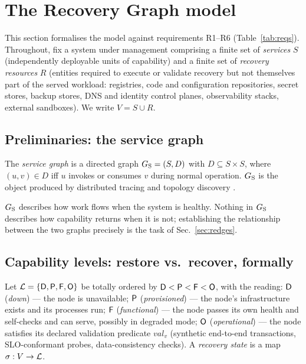 \section{The Recovery Graph model}
\label{sec:model}

This section formalises the model against requirements R1--R6 (Table~\ref{tab:reqs}). Throughout, fix a system under management comprising a finite set of \emph{services} $S$ (independently deployable units of capability) and a finite set of \emph{recovery resources} $R$ (entities required to execute or validate recovery but not themselves part of the served workload: registries, code and configuration repositories, secret stores, backup stores, DNS and identity control planes, observability stacks, external sandboxes). We write $V = S \cup R$.

\subsection{Preliminaries: the service graph}

\begin{definition}
\label{def:servicegraph}
The \emph{service graph} is a directed graph $G_{\mathrm{S}} = (S, D)$ with $D \subseteq S \times S$, where $(u,v) \in D$ iff $u$ invokes or consumes $v$ during normal operation. $G_{\mathrm{S}}$ is the object produced by distributed tracing and topology discovery \citep{sigelman2010dapper,luo2021characterizing}.
\end{definition}

$G_{\mathrm{S}}$ describes how work flows when the system is healthy. Nothing in $G_{\mathrm{S}}$ describes how capability returns when it is not; establishing the relationship between the two graphs precisely is the task of Sec.~\ref{sec:redges}.

\subsection{Capability levels: restore vs.\ recover, formally}
\label{sec:levels}

\begin{definition}
\label{def:levels}
Let $\mathcal{L} = \{\mathsf{D}, \mathsf{P}, \mathsf{F}, \mathsf{O}\}$ be totally ordered by $\mathsf{D} < \mathsf{P} < \mathsf{F} < \mathsf{O}$, with the reading: $\mathsf{D}$ (\emph{down}) --- the node is unavailable; $\mathsf{P}$ (\emph{provisioned}) --- the node's infrastructure exists and its processes run; $\mathsf{F}$ (\emph{functional}) --- the node passes its own health and self-checks and can serve, possibly in degraded mode; $\mathsf{O}$ (\emph{operational}) --- the node satisfies its declared validation predicate $\mathit{val}_v$ (synthetic end-to-end transactions, SLO-conformant probes, data-consistency checks). A \emph{recovery state} is a map $\sigma : V \to \mathcal{L}$.
\end{definition}

